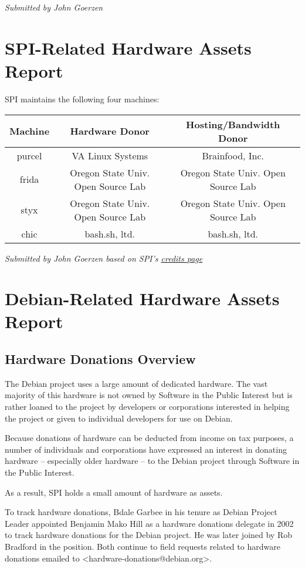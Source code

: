 \documentclass[letterpaper]{report}
\begin{document}
\emph{Submitted by John Goerzen}


\section{SPI-Related Hardware Assets Report}

SPI maintains the following four machines:

\begin{tabular}{|c|c|c|}
\hline
Machine & Hardware Donor & Hosting/Bandwidth Donor\tabularnewline
\hline
\hline
purcel & VA Linux Systems & Brainfood, Inc.\tabularnewline
\hline
frida & Oregon State Univ. Open Source Lab & Oregon State Univ. Open Source Lab\tabularnewline
\hline
styx & Oregon State Univ. Open Source Lab & Oregon State Univ. Open Source Lab\tabularnewline
\hline
chic & bash.sh, ltd. & bash.sh, ltd.\tabularnewline
\hline
\end{tabular}

\emph{Submitted by John Goerzen based on SPI's \href{http://www.spi-inc.org/credits}{credits page}}


\section{Debian-Related Hardware Assets Report}


\subsection{Hardware Donations Overview}

The Debian project uses a large amount of dedicated hardware. The
vast majority of this hardware is not owned by Software in the Public
Interest but is rather loaned to the project by developers or corporations
interested in helping the project or given to individual developers
for use on Debian.

Because donations of hardware can be deducted from income on tax purposes,
a number of individuals and corporations have expressed an interest
in donating hardware -- especially older hardware -- to the Debian
project through Software in the Public Interest.

As a result, SPI holds a small amount of hardware as assets.

To track hardware donations, Bdale Garbee in his tenure as Debian
Project Leader appointed Benjamin Mako Hill as a hardware donations
delegate in 2002 to track hardware donations for the Debian project.
He was later joined by Rob Bradford in the position. Both continue
to field requests related to hardware donations emailed to <hardware-donations@debian.org>.
\end{document}
